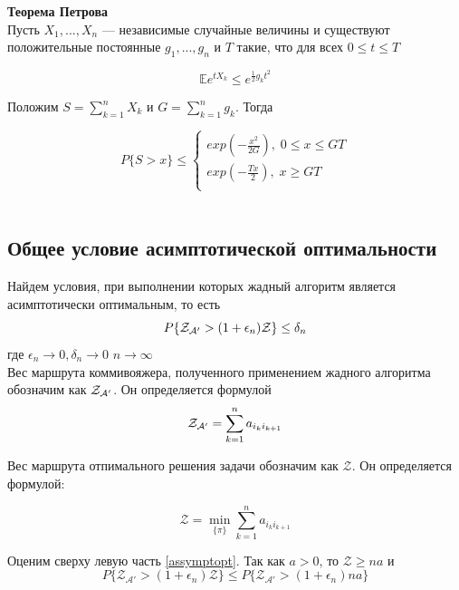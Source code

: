 \documentclass[a4paper, 14pt]{extarticle}
\numberwithin{equation}{section}
\begin{document}
\textbf{Теорема Петрова} \\

Пусть $X_1,...,X_n$ — независимые случайные величины и
существуют положительные постоянные $g_1,...,g_n$ и $T$ такие, что для всех $0 \leq t \leq T$

\begin{equation}
\mathbb {E}e^{tX_k} \leq e^{\frac{1}{2} g_k t^{2}}
\end{equation}

Положим $S=\sum_{k=1}^{n} X_k $ и $G=\sum_{k=1}^{n} g_k $. Тогда

\begin{equation}
P\{S > x\} \leq 
\begin{cases}
   exp (-\frac{x^{2}}{2G}), \; 0 \leq x \leq GT\\
   exp (-\frac{Tx}{2}), \; x\geq GT \\
 \end{cases}
\end{equation}\\


\subsection{Общее условие асимптотической оптимальности}

Найдем условия, при выполнении которых жадный алгоритм является асимптотически оптимальным, то есть
\begin{equation}\label{assymptopt}
P\{\text{$\mathcal{Z_{A'}}$} > (1+\epsilon_n)\mathcal{Z}\}\leq \delta_n
\end{equation}
где $\epsilon_n \rightarrow 0, \delta_n \rightarrow 0$ $n \rightarrow \infty$\\

Вес маршрута коммивояжера, полученного применением жадного алгоритма обозначим как $\text{$\mathcal{Z_{A'}}$}$. Он определяется формулой
\begin{equation}
\text{$\mathcal{Z_{A'}}$} = \sum_{k=1}^n a_{i_k i_{k+1}}
\end{equation}

Вес маршрута отпимального решения задачи обозначим как $\mathcal{Z}$. Он определяется формулой:

\begin{equation}
\mathcal{Z} = \min_{\{ \pi \}} \sum_{k=1}^n a_{i_k i_{k+1}}
\end{equation}


Оценим сверху левую часть \eqref{assymptopt}. Так как $a>0$, то $\mathcal{Z} \geq na$ и 
\begin{equation}\label{4}
P\{\mathcal{Z_{A'}} > (1+\epsilon_n)\mathcal{Z}\}\leq P\{\mathcal{Z_{A'}} > (1+\epsilon_n)na\}
\end{equation}
\end{document}
